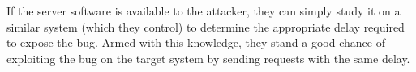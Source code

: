 If the server software is available to the attacker, they can simply study it on a similar system (which they control) to determine the appropriate delay required to expose the bug.
Armed with this knowledge, they stand a good chance of exploiting the bug on the target system by sending requests with the same delay.
\begin{figure}
	\centering
	\begin{subfigure}{\columnwidth}
		\caption{}
		\label{fig_save_op}
	\end{subfigure}
	\begin{subfigure}{\columnwidth}
		\caption{}
		\label{fig_two_threads}
	\end{subfigure}
	\begin{subfigure}{\columnwidth}

\end{subfigure}
\end{figure}
